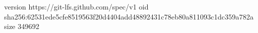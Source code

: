 version https://git-lfs.github.com/spec/v1
oid sha256:62531ede5cfe8519563f20d4404add48892431c78eb80a811093c1dc359a782a
size 349692
